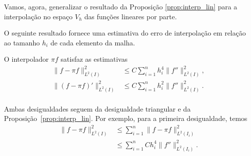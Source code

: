 Vamos, agora, generalizar o resultado da Proposição \ref{prop:interp_lin} para a interpolação no espaço $V_h$ das funções lineares por parte.



% 

O seguinte resultado fornece uma estimativa do erro de interpolação em relação ao tamanho $h_i$ de cada elemento da malha.

\begin{prop}\label{prop:interp_linpartes}
  O interpolador $\pi f$ satisfaz as estimativas
  \begin{align}
    \|f-\pi f\|_{L^2(I)}^2 &\leq C\sum_{i=1}^n h_i^4\|f''\|_{L^2(I)}^2,\\
    \|(f-\pi f)'\|_{L^2(I)}^2 &\leq C\sum_{i=1}^n h_i^2\|f''\|_{L^2(I)}^2.\\
  \end{align}
\end{prop}
\begin{dem}
  Ambas desigualdades seguem da desigualdade triangular e da Proposição~\ref{prop:interp_lin}. Por exemplo, para a primeira desigualdade, temos
  \begin{align}
    \|f - \pi f\|_{L^2(I)}^2 &\leq \sum_{i=1}^n \|f - \pi f\|_{L^2(I_i)}^2\\
    &\leq \sum_{i=1}^n Ch_i^4 \|f''\|_{L^2(I_i)}^2.
  \end{align}
\end{dem}

